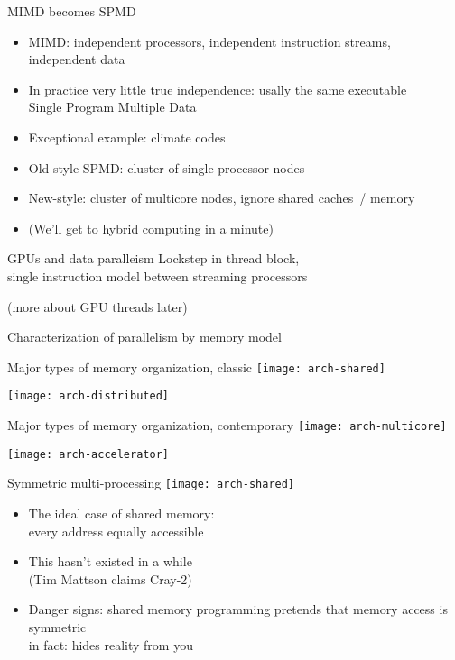 \begin{numberedframe}{MIMD becomes SPMD}
  \begin{itemize}
  \item MIMD: independent processors, independent instruction streams, independent data
  \item In practice very little true independence: usally the same executable\\
    Single Program Multiple Data
  \item Exceptional example: climate codes
  \item Old-style SPMD: cluster of single-processor nodes
  \item New-style: cluster of multicore nodes, ignore shared caches~/ memory
  \item (We'll get to hybrid computing in a minute)
  \end{itemize}  
\end{numberedframe}

\begin{numberedframe}{GPUs and data paralleism}
  Lockstep in thread block, \\
  single instruction model between streaming processors

  (more about GPU threads later)
\end{numberedframe}

 {Characterization of parallelism by memory model}

\begin{numberedframe}{Major types of memory organization, classic}
  \texttt{[image: arch-shared]}

  \texttt{[image: arch-distributed]}
\end{numberedframe}

\begin{numberedframe}{Major types of memory organization, contemporary}
  \texttt{[image: arch-multicore]}

  \texttt{[image: arch-accelerator]}
\end{numberedframe}

\begin{numberedframe}{Symmetric multi-processing}
  \texttt{[image: arch-shared]}
  \begin{itemize}
  \item The ideal case of shared memory:\\
    every address equally accessible
  \item This hasn't existed in a while\\
    (Tim Mattson claims Cray-2)
  \item Danger signs: shared memory programming pretends
    that memory access is symmetric\\
    in fact: hides reality from you
  \end{itemize}
\end{numberedframe}


